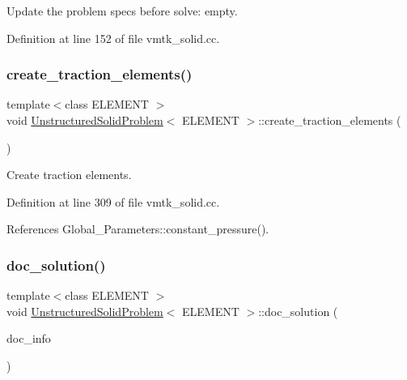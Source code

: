 Update the problem specs before solve\+: empty. 



Definition at line 152 of file vmtk\+\_\+solid.\+cc.

\mbox{\label{classUnstructuredSolidProblem_a9137960284200ed998989f785965f902}} 
\subsubsection{\texorpdfstring{create\+\_\+traction\+\_\+elements()}{create\_traction\_elements()}}
{\footnotesize\ttfamily template$<$class E\+L\+E\+M\+E\+NT $>$ \\
void \hyperlink{classUnstructuredSolidProblem}{Unstructured\+Solid\+Problem}$<$ E\+L\+E\+M\+E\+NT $>$\+::create\+\_\+traction\+\_\+elements (\begin{DoxyParamCaption}{ }\end{DoxyParamCaption})\hspace{0.3cm}{\ttfamily [private]}}



Create traction elements. 



Definition at line 309 of file vmtk\+\_\+solid.\+cc.



References Global\+\_\+\+Parameters\+::constant\+\_\+pressure().

\mbox{\label{classUnstructuredSolidProblem_ab3d66fd61b69d12b4f159d763fc44f15}} 
\subsubsection{\texorpdfstring{doc\+\_\+solution()}{doc\_solution()}}
{\footnotesize\ttfamily template$<$class E\+L\+E\+M\+E\+NT $>$ \\
void \hyperlink{classUnstructuredSolidProblem}{Unstructured\+Solid\+Problem}$<$ E\+L\+E\+M\+E\+NT $>$\+::doc\+\_\+solution (\begin{DoxyParamCaption}\item[{Doc\+Info \&}]{doc\+\_\+info }\end{DoxyParamCaption})}



